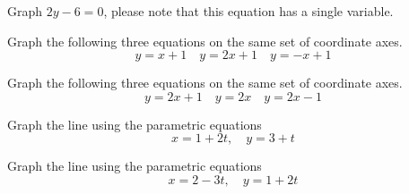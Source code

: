 \begin{puzzle}
    Graph \(2y - 6 = 0\), please note that this equation has a single variable.
\end{puzzle}

\begin{puzzle}
    Graph the following three equations on the same set of coordinate axes.
    \[
        y = x + 1 \quad y = 2x + 1 \quad y = -x + 1
    \]
\end{puzzle}

\begin{puzzle}
    Graph the following three equations on the same set of coordinate axes.
    \[
        y = 2x + 1 \quad y = 2x \quad y = 2x - 1
    \]
\end{puzzle}

\begin{puzzle}
    Graph the line using the parametric equations
    \[
        x = 1 + 2t, \quad y = 3 + t
    \]
\end{puzzle}

\begin{puzzle}
    Graph the line using the parametric equations
    \[
        x = 2 - 3t, \quad y = 1 + 2t
    \]
\end{puzzle}